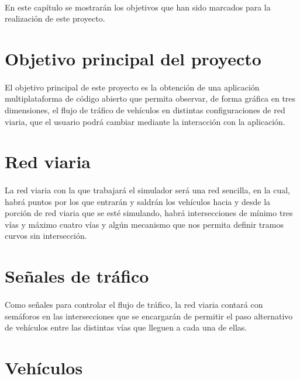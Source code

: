 	\paragraph{}
	En este capítulo se mostrarán los objetivos que han sido marcados para la realización de este proyecto.

\section{Objetivo principal del proyecto}

	\paragraph{}
	El objetivo principal de este proyecto es la obtención de una aplicación multiplataforma de código abierto que permita observar, de forma gráfica en tres dimensiones, el flujo de tráfico de vehículos en distintas configuraciones de red viaria, que el usuario podrá cambiar mediante la interacción con la aplicación.
	
\section{Red viaria}

	\paragraph{}
	La red viaria con la que trabajará el simulador será una red sencilla, en la cual, habrá puntos por los que entrarán y saldrán los vehículos hacia y desde la porción de red viaria que se esté simulando, habrá intersecciones de mínimo tres vías y máximo cuatro vías y algún mecanismo que nos permita definir tramos curvos sin intersección.

\section{Señales de tráfico}

	\paragraph{}
	Como señales para controlar el flujo de tráfico, la red viaria contará con semáforos en las intersecciones que se encargarán de permitir el paso alternativo de vehículos entre las distintas vías que lleguen a cada una de ellas.
	
\section{Vehículos}
	

